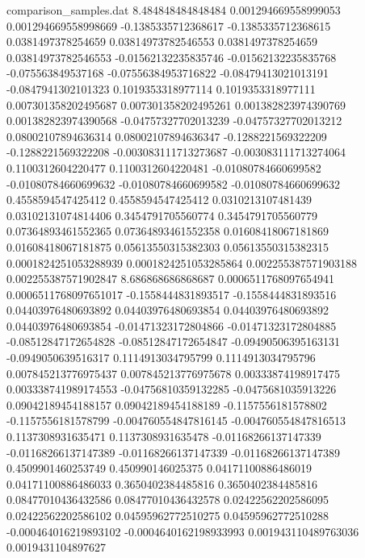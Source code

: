 \begin{filecontents}{comparison_samples.dat}
8.484848484848484   0.001294669558999053    0.001294669558998669    -0.1385335712368617    -0.1385335712368615    0.0381497378254659     0.03814973782546553    0.0381497378254659     0.03814973782546553    -0.01562132235835746   -0.01562132235835768   -0.075563849537168      -0.07556384953716822    -0.08479413021013191   -0.0847941302101323    0.1019353318977114      0.1019353318977111      0.007301358202495687    0.007301358202495261    0.001382823974390769    0.001382823974390568    -0.04757327702013239    -0.04757327702013212    0.08002107894636314     0.08002107894636347     -0.1288221569322209     -0.1288221569322208     -0.003083111713273687  -0.003083111713274064  0.1100312604220477     0.1100312604220481     -0.01080784660699582    -0.01080784660699632    -0.01080784660699582    -0.01080784660699632    0.4558594547425412     0.4558594547425412     0.0310213107481439      0.03102131074814406     0.3454791705560774     0.3454791705560779     0.07364893461552365     0.07364893461552358     0.01608418067181869     0.01608418067181875     0.05613550315382303    0.05613550315382315    0.0001824251053288939  0.0001824251053285864  0.002255387571903188    0.002255387571902847  
8.686868686868687   0.0006511768097654941   0.0006511768097651017   -0.1558444831893517    -0.1558444831893516    0.04403976480693892    0.04403976480693854    0.04403976480693892    0.04403976480693854    -0.01471323172804866   -0.01471323172804885   -0.08512847172654828    -0.08512847172654847    -0.09490506395163131   -0.0949050639516317    0.1114913034795799      0.1114913034795796      0.007845213776975437    0.007845213776975678    0.00333874198917475     0.003338741989174553    -0.04756810359132285    -0.0475681035913226     0.09042189454188157     0.09042189454188189     -0.1157556181578802     -0.1157556181578799     -0.004760554847816145  -0.004760554847816513  0.1137308931635471     0.1137308931635478     -0.01168266137147339    -0.01168266137147389    -0.01168266137147339    -0.01168266137147389    0.4509901460253749     0.450990146025375      0.04171100886486019     0.04171100886486033     0.3650402384485816     0.3650402384485816     0.08477010436432586     0.08477010436432578     0.02422562202586095     0.02422562202586102     0.04595962772510275    0.04595962772510288    -0.000464016219893102  -0.0004640162198933993 0.001943110489763036    0.0019431104897627    

\end{filecontents}
